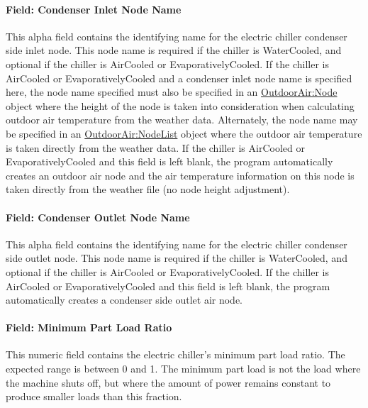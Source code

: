 \paragraph{Field: Condenser Inlet Node Name}\label{field-condenser-inlet-node-name-3}

This alpha field contains the identifying name for the electric chiller condenser side inlet node. This node name is required if the chiller is WaterCooled, and optional if the chiller is AirCooled or EvaporativelyCooled. If the chiller is AirCooled or EvaporativelyCooled and a condenser inlet node name is specified here, the node name specified must also be specified in an \hyperref[outdoorairnode]{OutdoorAir:Node} object where the height of the node is taken into consideration when calculating outdoor air temperature from the weather data. Alternately, the node name may be specified in an \hyperref[outdoorairnodelist]{OutdoorAir:NodeList} object where the outdoor air temperature is taken directly from the weather data. If the chiller is AirCooled or EvaporativelyCooled and this field is left blank, the program automatically creates an outdoor air node and the air temperature information on this node is taken directly from the weather file (no node height adjustment).

\paragraph{Field: Condenser Outlet Node Name}\label{field-condenser-outlet-node-name-3}

This alpha field contains the identifying name for the electric chiller condenser side outlet node. This node name is required if the chiller is WaterCooled, and optional if the chiller is AirCooled or EvaporativelyCooled. If the chiller is AirCooled or EvaporativelyCooled and this field is left blank, the program automatically creates a condenser side outlet air node.

\paragraph{Field: Minimum Part Load Ratio}\label{field-minimum-part-load-ratio-2}

This numeric field contains the electric chiller's minimum part load ratio. The expected range is between 0 and 1. The minimum part load is not the load where the machine shuts off, but where the amount of power remains constant to produce smaller loads than this fraction.

